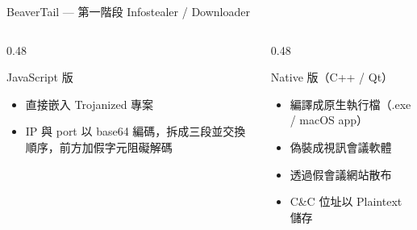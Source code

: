 \documentclass{beamer}
\begin{document}
\begin{frame}{BeaverTail — 第一階段 Infostealer / Downloader}
  \begin{columns}[T]
    \begin{column}{0.48\textwidth}
      \begin{block}{JavaScript 版}
        \begin{itemize}
          \item 直接嵌入 Trojanized 專案
          \item IP 與 port 以 base64 編碼，拆成三段並交換順序，前方加假字元阻礙解碼
        \end{itemize}
      \end{block}
    \end{column}
    \begin{column}{0.48\textwidth}
      \begin{block}{Native 版（C++ / Qt）}
        \begin{itemize}
          \item 編譯成原生執行檔（.exe / macOS app）
          \item 偽裝成視訊會議軟體
          \item 透過假會議網站散布
          \item C\&C 位址以 Plaintext 儲存
        \end{itemize}
      \end{block}
    \end{column}
  \end{columns}

\end{frame}
\end{document}
